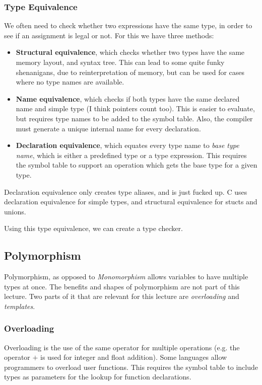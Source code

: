 \documentclass{article}
\begin{document}
\subsubsection{Type Equivalence}
We often need to check whether two expressions have the same type, in order to see if an assignment is legal or not.
For this we have three methods:
\begin{itemize}
	\item \textbf{Structural equivalence}, which checks whether two types have the same memory layout, and syntax tree.
		This can lead to some quite funky shenanigans, due to reinterpretation of memory, but can be used for cases where no type names are available.
	\item \textbf{Name equivalence}, which checks if both types have the same declared name and simple type (I think pointers count too).
		This is easier to evaluate, but requires type names to be added to the symbol table.
		Also, the compiler must generate a unique internal name for every declaration.
	\item \textbf{Declaration equivalence}, which equates every type name to \emph{base type name}, which is either a predefined type or a type expression.
		This requires the symbol table to support an operation which gets the base type for a given type.
\end{itemize}

\begin{keypointbox}
	Declaration equivalence only creates type aliases, and is just fucked up.
	C uses declaration equivalence for simple types, and structural equivalence for stucts and unions.
\end{keypointbox}

Using this type equivalence, we can create a type checker.

\subsection{Polymorphism}
Polymorphism, as opposed to \emph{Monomorphism} allows variables to have multiple types at once.
The benefits and shapes of polymorphism are not part of this lecture.
Two parts of it that are relevant for this lecture are \emph{overloading} and \emph{templates}.

\subsubsection{Overloading}
Overloading is the use of the same operator for multiple operations (e.g. the operator $+$ is used for integer and float addition).
Some languages allow programmers to overload user functions.
This requires the symbol table to include types as parameters for the lookup for function declarations.
\end{document}
